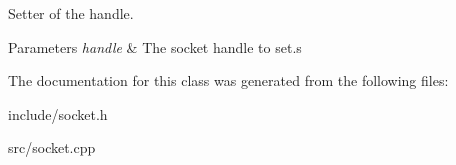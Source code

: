 Setter of the handle. 


\begin{DoxyParams}{Parameters}
{\em handle} & The socket handle to set.\+s \\
\hline
\end{DoxyParams}


The documentation for this class was generated from the following files\+:\begin{DoxyCompactItemize}
\item 
include/socket.\+h\item 
src/socket.\+cpp\end{DoxyCompactItemize}
